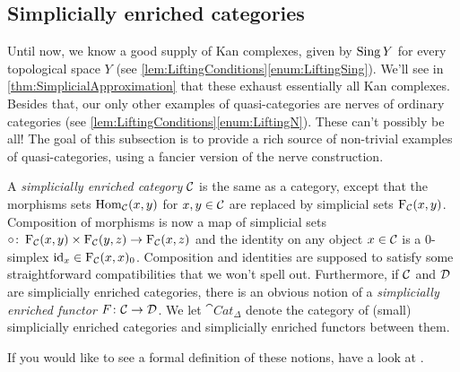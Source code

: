 \subsection{Simplicially enriched categories}
Until now, we know a good supply of Kan complexes, given by $\operatorname{Sing} Y$ for every topological space $Y$ (see \cref{lem:LiftingConditions}\cref{enum:LiftingSing}). We'll see in \cref{thm:SimplicialApproximation} that these exhaust essentially all Kan complexes. Besides that, our only other examples of quasi-categories are nerves of ordinary categories (see \cref{lem:LiftingConditions}\cref{enum:LiftingN}). These can't possibly be all! The goal of this subsection is to provide a rich source of non-trivial examples of quasi-categories, using a fancier version of the nerve construction.
\begin{numpar}
	A \emph{simplicially enriched category} $\mathcal{C}$ is the same as a category, except that the morphisms sets $\operatorname{Hom}_{\mathcal{C}}(x,y)$ for $x,y\in\mathcal{C}$ are replaced by simplicial sets $\operatorname{F}_{\mathcal{C}}(x,y)$. Composition of morphisms is now a map of simplicial sets $\circ\colon \operatorname{F}_{\mathcal{C}}(x,y)\times\operatorname{F}_{\mathcal{C}}(y,z)\rightarrow\operatorname{F}_{\mathcal{C}}(x,z)$ and the identity on any object $x\in\mathcal{C}$ is a $0$-simplex $\operatorname{id}_x\in\operatorname{F}_{\mathcal{C}}(x,x)_0$. Composition and identities are supposed to satisfy some straightforward compatibilities that we won't spell out. Furthermore, if $\mathcal{C}$ and $\mathcal{D}$ are simplicially enriched categories, there is an obvious notion of a \emph{simplicially enriched functor $F\colon \mathcal{C}\rightarrow\mathcal{D}$}. We let $\cat{Cat}_\Delta$ denote the category of (small) simplicially enriched categories and simplicially enriched functors between them. 
	
	If you would like to see a formal definition of these notions, have a look at \cite[Definitions~1.2.34 and~1.2.35]{Land}.
\end{numpar}
